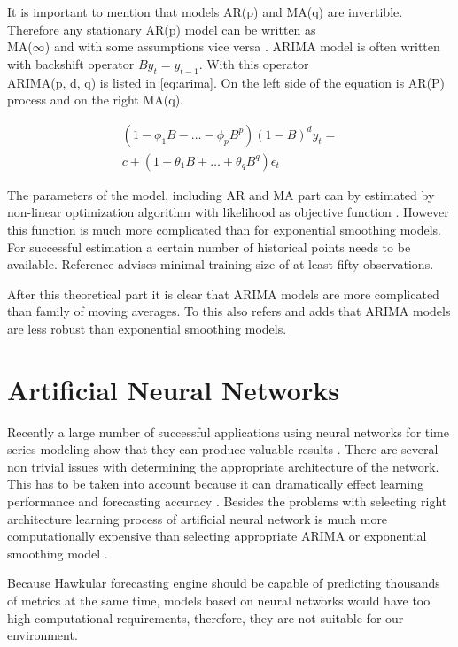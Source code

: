     It is important to mention that models AR(p) and MA(q) are invertible. Therefore any stationary AR(p) model can
    be written as \\MA($\infty$) and with some assumptions vice versa \cite{brockwell}. ARIMA model is often written
    with backshift operator $By_t=y_{t-1}$. With this operator \\ARIMA(p, d, q) is listed in \ref{eq:arima}. On the
    left side of the equation is AR(P) process and on the right MA(q).

    \begin{gather} \label{eq:arima}
        (1- \phi_1B - \dots - \phi_pB^p)(1-B)^d y_t = \\ \nonumber
         c + (1+\theta_1B+\dots+\theta_qB^q) \epsilon_t
    \end{gather}

    The parameters of the model, including AR and MA part can by estimated by non-linear optimization algorithm
    with likelihood as objective function \cite{brockwell}. However this function is much more complicated than for
    exponential smoothing models. For successful estimation a certain number of historical points needs to
    be available. Reference \cite{cipra} advises minimal training size of at least fifty observations.

    After this theoretical part it is clear that ARIMA models are more complicated than family of moving averages.
    To this also refers \cite{hyndman-forecasting} and adds that ARIMA models are less robust than exponential
    smoothing models.

    \section{Artificial Neural Networks} \label{sec:ann}
    Recently a large number of successful applications using neural networks for time series modeling show that they
    can produce valuable results \cite{ann-forecasting-state-art}. There are several non trivial issues with
    determining the appropriate architecture of the network. This has to be taken into account because it can
    dramatically effect learning performance and forecasting accuracy \cite{ann-model-selecting}.
    Besides the problems with selecting right architecture learning process of artificial neural network is much more
    computationally expensive than selecting appropriate ARIMA or exponential smoothing model \cite{ann-forecasting}.

    Because Hawkular forecasting engine should be capable of predicting thousands of metrics at the same time, models
    based on neural networks would have too high computational requirements, therefore, they are not suitable for our
    environment.

